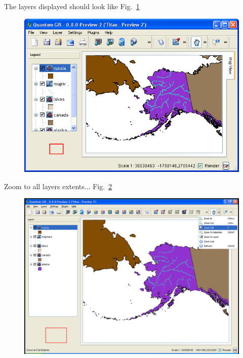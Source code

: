 The layers displayed should look like Fig.~\ref{fig:qgis003}

\begin{figure}[htbp]
   \centering
   \includegraphics[scale=0.35]{qgis003.png}
   \caption{}
   \label{fig:qgis003}
\end{figure}

Zoom to all layers extents... Fig.~\ref{fig:qgis004}

\begin{figure}[htbp]
   \centering
   \includegraphics[scale=0.2]{qgis004.png}
   \caption{}
   \label{fig:qgis004}
\end{figure}

